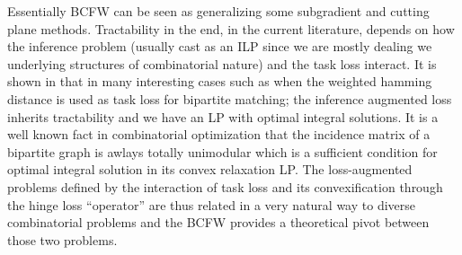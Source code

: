 Essentially BCFW can be seen as generalizing some subgradient and cutting plane
methods. Tractability in the end, in the current literature, depends on how the
inference problem (usually cast as an ILP since we are mostly dealing we
underlying structures of combinatorial nature) and the task loss interact. It is
shown in \cite{taskarStructuredPredictionDual2006} that in many interesting
cases such as when the weighted hamming distance is used as task loss for
bipartite matching; the inference augmented loss inherits tractability and we
have an LP with optimal integral solutions. It is a well known fact in
combinatorial optimization that the incidence matrix of a bipartite graph is
awlays totally unimodular which is a sufficient condition for optimal integral
solution in its convex relaxation LP. The loss-augmented problems defined by the
interaction of task loss and its convexification through the hinge loss
``operator'' are thus related in a very natural way to diverse combinatorial
problems and the BCFW provides a theoretical pivot between those two problems.






